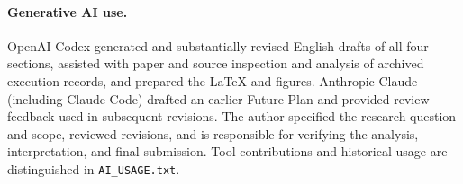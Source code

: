 \documentclass{article}
\begin{document}
\paragraph{Generative AI use.}
OpenAI Codex generated and substantially revised English drafts of all four sections, assisted with paper and source inspection and analysis of archived execution records, and prepared the LaTeX and figures. Anthropic Claude (including Claude Code) drafted an earlier Future Plan and provided review feedback used in subsequent revisions. The author specified the research question and scope, reviewed revisions, and is responsible for verifying the analysis, interpretation, and final submission. Tool contributions and historical usage are distinguished in \texttt{AI\_USAGE.txt}.

\endgroup
\end{document}

